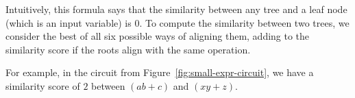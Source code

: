 Intuitively, this formula says that the similarity between any tree and a leaf node (which is an input variable) is $0$.
To compute the similarity between two trees, we consider the best of all six possible ways of aligning them, adding to the similarity score if the roots align with the same operation. %

For example, in the circuit from Figure~\ref{fig:small-expr-circuit}, we have a similarity score of $2$ between $(ab + c)$ and $(xy + z)$. 



